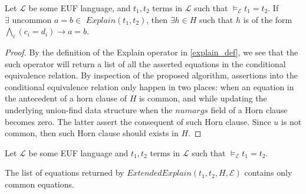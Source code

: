 \begin{lemma} \label{existence_horn_in_explain}
  Let $\mathcal{L}$ be some EUF language, 
  and $t_1, t_2$ terms in 
  $\mathcal{L}$ such that
  $\models_{\mathcal{E}} t_1 = t_2$.
  If $\exists \text{ uncommon } a = b \in$
  $Explain(t_1, t_2)$, then $\exists h \in H$ such 
  that $h$ is of the form 
  $\bigwedge_i (c_i = d_i) \rightarrow a = b$.
\end{lemma}

\begin{proof}
  By the definition of the Explain operator in \ref{explain_def},
  we see that the such operator will return a
  list of all the asserted equations in the conditional
  equivalence relation. By inspection of the proposed
  algorithm, assertions into the conditional equivalence
  relation only happen in two places: when an equation 
  in the antecedent of a horn clause of $H$ is common, 
  and while updating the underlying union-find data structure
  when the $numargs$ field of a Horn clause becomes
  zero. The latter assert the consequent of such Horn clause.
  Since $u$ is not common, then such Horn clause 
  should exists in $H$.
\end{proof}

\begin{lemma}\label{extended_explain_common_lemma}

  Let $\mathcal{L}$ be some EUF language 
  and $t_1, t_2$ terms in 
  $\mathcal{L}$ such that
  $\models_{\mathcal{E}} t_1 = t_2$.

  The list of equations returned by $ExtendedExplain(t_1, t_2, 
  H, \mathcal{E})$ contains only common equations.
\end{lemma}

